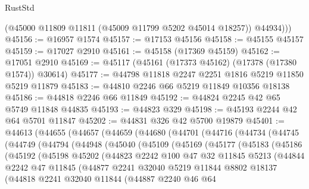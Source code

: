 \begin{lexlean}{RustStd}
\begin{coremodule}
          (@45000 @11809 @11811 (@45009 @11799 @5202 @45014 @18257))
          @44934)))
@45156 := @16957 @1574
@45157 := @17153 @45156
@45158 := @45155 @45157
@45159 := @17027 @2910
@45161 := @45158 (@17369 @45159)
@45162 := @17051 @2910
@45169 := @45117 (@45161 (@17373 @45162) (@17378 (@17380 @1574)) @30614)
@45177 := @44798 @11818 @2247 @2251 @1816 @5219 @11850 @5219 @11879
@45183 := @44810 @2246 @66 @5219 @11849 @10356 @18138
@45186 := @44818 @2246 @66 @11849
@45192 := @44824 @2245 @42 @65 @5749 @11848 @44835
@45193 := @44823 @329
@45198 := @45193 @2244 @42 @64 @5701 @11847
@45202 := @44831 @326 @42 @5700 @19879
@45401 := @44613
    (@44655
      (@44657
        (@44659
          (@44680
            (@44701
              (@44716
                (@44734
                  (@44745
                    (@44749
                      (@44794
                        (@44948
                          (@45040
                            (@45109
                              (@45169
                                (@45177
                                  (@45183
                                    (@45186
                                      (@45192
                                        (@45198
                                          @45202
                                          (@44823
                                            @2242
                                            @100
                                            @47
                                            @32
                                            @11845
                                            @5213
                                            (@44844
                                              @2242
                                              @47
                                              @11845
                                              (@44877
                                                @2241
                                                @32040
                                                @5219
                                                @11844
                                                @8802
                                                @18137
                                                (@44818
                                                  @2241
                                                  @32040
                                                  @11844
                                                  (@44887
                                                    @2240
                                                    @46
                                                    @64

\end{coremodule}
\end{lexlean}
